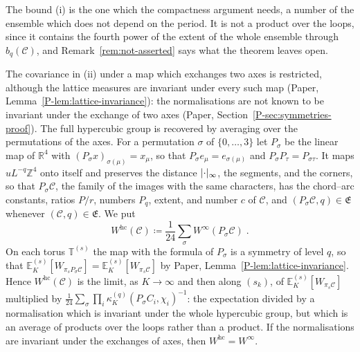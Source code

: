 \documentclass[11pt]{preprint}
\DeclarePairedDelimiter{\abs}{\lvert}{\rvert}
\numberwithin{equation}{section}
\theoremstyle{definition}
\theoremstyle{remark}
\theoremstyle{plain}
\begin{document}
The bound (i) is the one which the compactness argument needs, a number of the ensemble which does not depend on the period. It is not a product over the loops, since it contains the fourth power of the extent of the whole ensemble through $b_q(\mathcal C)$, and Remark~\ref{rem:not-asserted} says what the theorem leaves open.

The covariance in (ii) under a map which exchanges two axes is restricted, although the lattice measures are invariant under every such map (Paper, Lemma~\ref{P-lem:lattice-invariance}): the normalisations are not known to be invariant under the exchange of two axes (Paper, Section~\ref{P-sec:symmetries-proof}). The full hypercubic group is recovered by averaging over the permutations of the axes. For a permutation $\sigma$ of $\{ 0, \dots, 3 \}$ let $P_\sigma$ be the linear map of $\mathbb R^4$ with $(P_\sigma x)_{\sigma(\mu)} = x_\mu$, so that $P_\sigma e_\mu = e_{\sigma(\mu)}$ and $P_\sigma P_\tau = P_{\sigma\tau}$. It maps $uL^{-q}\mathbb Z^4$ onto itself and preserves the distance $\abs{\cdot}_\infty$, the segments, and the corners, so that $P_\sigma\mathcal C$, the family of the images with the same characters, has the chord--arc constants, ratios $P/r$, numbers $P_q$, extent, and number $c$ of $\mathcal C$, and $(P_\sigma\mathcal C, q) \in \mathfrak E$ whenever $(\mathcal C, q) \in \mathfrak E$. We put
\begin{equation}\label{eq:hypercubic-average}
    W^{\mathrm{hc}}(\mathcal C) \coloneqq \frac{1}{24}\sum_{\sigma}W^\infty(P_\sigma\mathcal C)\;.
\end{equation}
On each torus $\mathbb T^{(s)}$ the map with the formula of $P_\sigma$ is a symmetry of level $q$, so that $\mathbb E^{(s)}_K[W_{\pi_sP_\sigma\mathcal C}] = \mathbb E^{(s)}_K[W_{\pi_s\mathcal C}]$ by Paper, Lemma~\ref{P-lem:lattice-invariance}. Hence $W^{\mathrm{hc}}(\mathcal C)$ is the limit, as $K \to \infty$ and then along $(s_k)$, of $\mathbb E^{(s)}_K[W_{\pi_s\mathcal C}]$ multiplied by $\frac{1}{24}\sum_\sigma\prod_i\kappa^{(q)}_K(P_\sigma C_i, \chi_i)^{-1}$: the expectation divided by a normalisation which is invariant under the whole hypercubic group, but which is an average of products over the loops rather than a product. If the normalisations are invariant under the exchanges of axes, then $W^{\mathrm{hc}} = W^\infty$.
\end{document}
